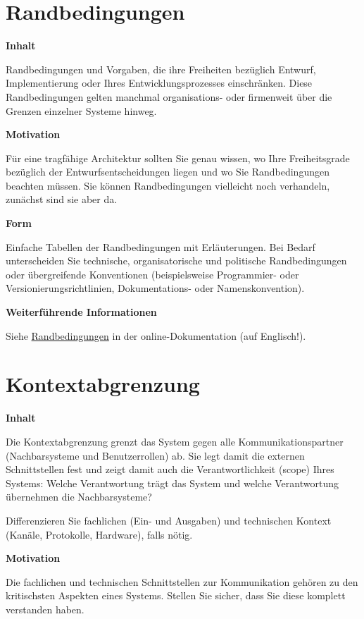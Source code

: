 \documentclass[
]{article}
\begin{document}
\section{Randbedingungen}\label{section-architecture-constraints}

\textbf{Inhalt}

Randbedingungen und Vorgaben, die ihre Freiheiten bezüglich Entwurf,
Implementierung oder Ihres Entwicklungsprozesses einschränken. Diese
Randbedingungen gelten manchmal organisations- oder firmenweit über die
Grenzen einzelner Systeme hinweg.

\textbf{Motivation}

Für eine tragfähige Architektur sollten Sie genau wissen, wo Ihre
Freiheitsgrade bezüglich der Entwurfsentscheidungen liegen und wo Sie
Randbedingungen beachten müssen. Sie können Randbedingungen vielleicht
noch verhandeln, zunächst sind sie aber da.

\textbf{Form}

Einfache Tabellen der Randbedingungen mit Erläuterungen. Bei Bedarf
unterscheiden Sie technische, organisatorische und politische
Randbedingungen oder übergreifende Konventionen (beispielsweise
Programmier- oder Versionierungsrichtlinien, Dokumentations- oder
Namenskonvention).

\textbf{Weiterführende Informationen}

Siehe \href{https://docs.arc42.org/section-2/}{Randbedingungen} in der
online-Dokumentation (auf Englisch!).

\section{Kontextabgrenzung}\label{section-context-and-scope}

\textbf{Inhalt}

Die Kontextabgrenzung grenzt das System gegen alle Kommunikationspartner
(Nachbarsysteme und Benutzerrollen) ab. Sie legt damit die externen
Schnittstellen fest und zeigt damit auch die Verantwortlichkeit (scope)
Ihres Systems: Welche Verantwortung trägt das System und welche
Verantwortung übernehmen die Nachbarsysteme?

Differenzieren Sie fachlichen (Ein- und Ausgaben) und technischen
Kontext (Kanäle, Protokolle, Hardware), falls nötig.

\textbf{Motivation}

Die fachlichen und technischen Schnittstellen zur Kommunikation gehören
zu den kritischsten Aspekten eines Systems. Stellen Sie sicher, dass Sie
diese komplett verstanden haben.
\end{document}
